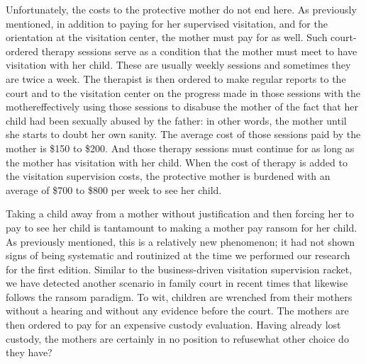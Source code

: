\vspace{1em}

\vspace{-.5em}

\noindent{}Unfortunately, the costs to the protective mother do not end here. As
previously mentioned, in addition to paying for her supervised visitation, and for the orientation at the visitation center, the mother must
pay for  as well. 
Such court-ordered therapy sessions serve
as a condition that the mother must meet to have visitation with her
child. These are usually weekly sessions and sometimes they are twice a
week. The therapist is then ordered to make regular reports to the court
and to the visitation center on the progress made in those sessions with
the mother\mdash{}effectively using those sessions to disabuse the mother of
the fact that her child had been sexually abused by the father: in other words,
 the mother until she starts to doubt her own sanity. The average cost of those  sessions paid by the mother is \$150 to \$200.
And those therapy sessions must continue for as long as the mother has
visitation with her child. When the cost of therapy is added to the visitation
supervision costs, the protective mother is burdened with an average of
\$700 to \$800 per week to see her child. \pfl{}\newpage{}


\vspace{-.5em}

\noindent{}Taking a child away from a mother without justification and
then forcing her to pay to see her child is tantamount to making a mother pay
ransom for her child. As previously mentioned, this is a relatively new
phenomenon; it had not shown signs of being systematic and routinized
at the time we performed our research for the first edition. Similar to the
business-driven visitation supervision racket, we have detected another
scenario in family court in recent times that likewise follows the ransom
paradigm. To wit, children are wrenched from their mothers without a
hearing and without any evidence before the court. The mothers are then
ordered to pay for an expensive custody evaluation. Having already lost
custody, the mothers are certainly in no position to refuse\mdash{}what other
choice do they have? \pfl{}

